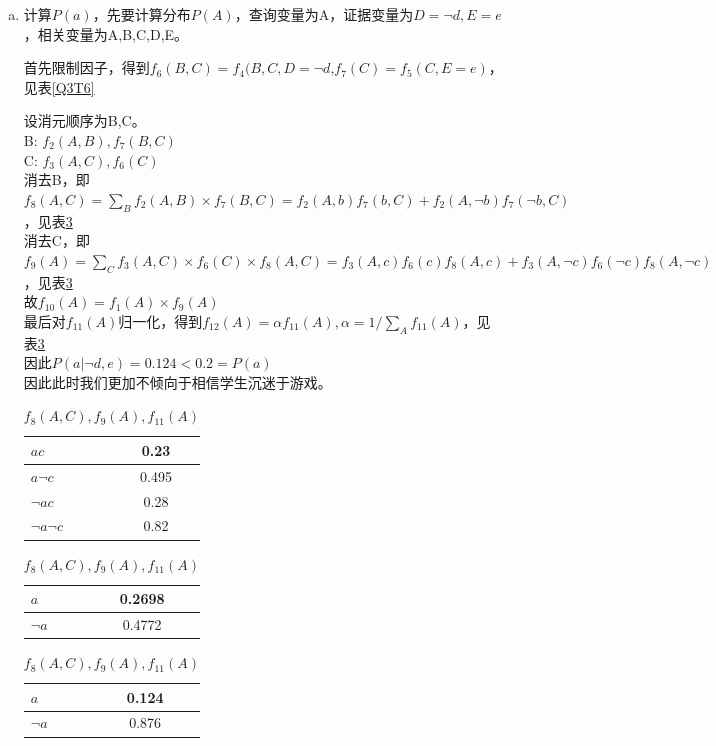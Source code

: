 \documentclass[a4paper, 11pt]{article}
\begin{document}
\begin{enumerate}
\begin{enumerate}[(a)]
    \item
    计算$P(a)$，先要计算分布$P(A)$，查询变量为A，证据变量为$D=\lnot d,E=e$，相关变量为A,B,C,D,E。

    首先限制因子，得到$f_{6}(B,C)=f_{4}(B,C,D=\lnot d$,$f_{7}(C)=f_{5}(C,E=e)$，见表\ref{Q3T6}

    设消元顺序为B,C。\\
    B: $f_{2}(A,B),f_{7}(B,C)$\\
    C: $f_{3}(A,C),f_{6}(C)$\\
    消去B，即$f_{8}(A,C)=\sum_B f_{2}(A,B) \times f_{7}(B,C) = f_{2}(A,b)f_{7}(b,C)+f_{2}(A,\lnot b)f_{7}(\lnot b,C)$，见表\ref{Q3T4}\\
    消去C，即$f_{9}(A)=\sum_C f_{3}(A,C) \times f_{6}(C) \times f_{8}(A,C) = f_{3}(A,c)f_{6}(c)f_{8}(A,c)+f_{3}(A,\lnot c)f_{6}(\lnot c)f_{8}(A,\lnot c)$，见表\ref{Q3T4}\\
    故$f_{10}(A)=f_1(A) \times f_9(A)$\\
    最后对$f_{11}(A)$归一化，得到$f_{12}(A)=\alpha f_{11}(A), \alpha = 1/ \sum_A f_{11}(A)$，见表\ref{Q3T4}\\
    因此$P(a|\lnot d,e)=0.124<0.2=P(a)$\\
    因此此时我们更加不倾向于相信学生沉迷于游戏。
    \begin{table}[ht]
      \centering
      \begin{tabular}{|l|c|}
        \hline
        $ac$&0.23\\
        \hline
        $a\lnot c$&0.495\\
        \hline
        $\lnot ac$&0.28\\
        \hline
        $\lnot a\lnot c$&0.82\\
        \hline
      \end{tabular}
      \begin{tabular}{|l|c|}
        \hline
        $a$&0.2698\\
        \hline
        $\lnot a$&0.4772\\
        \hline
      \end{tabular}
      \begin{tabular}{|l|c|}
        \hline
        $a$&0.124\\
        \hline
        $\lnot a$&0.876\\
        \hline
      \end{tabular}
      \caption{$f_8(A,C),f_9(A),f_{11}(A)$}
      \label{Q3T4}
    \end{table}
    \end{enumerate}




\end{enumerate}
\end{document}
